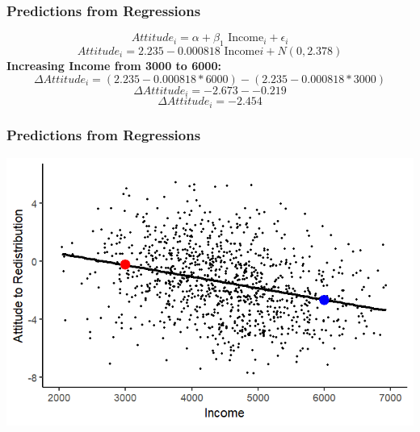 \documentclass[xcolor=x11names,compress]{beamer}\usepackage[]{graphicx}\usepackage[]{color}
\makeatletter
\def\maxwidth{ %
  \ifdim\Gin@nat@width>\linewidth
    \linewidth
  \else
    \Gin@nat@width
  \fi
}
\newenvironment{knitrout}{}{} %
\renewcommand{\(}{\begin{columns}}
\renewcommand{\)}{\end{columns}}
\newcommand{\<}[1]{\begin{column}{#1}}
\renewcommand{\>}{\end{column}}
\makeatother
\begin{document}
\begin{frame}
\frametitle{Predictions from Regressions}
$$Attitude_i = \alpha + \beta_1 \text{ Income}_i + \epsilon_i$$
$$Attitude_i = 2.235 - 0.000818 \text{ Income}i + N(0,2.378)$$
\textbf{Increasing Income from 3000 to 6000:} \\
$$\Delta Attitude_i = (2.235-0.000818*6000) - (2.235-0.000818*3000)$$
$$\Delta Attitude_i = -2.673 - -0.219$$
$$\Delta Attitude_i = -2.454$$
\end{frame}

\begin{frame}
\frametitle{Predictions from Regressions}
\begin{knitrout}
\color{fgcolor}
\includegraphics[width=\maxwidth]{figure/predictions1-1} 

\end{knitrout}
\end{frame}
\end{document}

